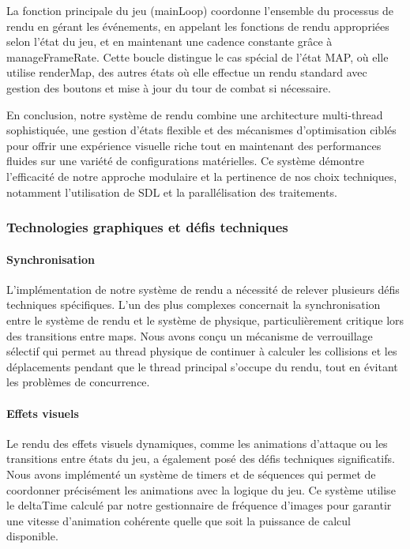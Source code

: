 \documentclass[12pt,a4paper, twoside]{article}
\begin{document}
La fonction principale du jeu (mainLoop) coordonne l'ensemble du processus de rendu en gérant les événements, en appelant les fonctions de rendu appropriées selon l'état du jeu, et en maintenant une cadence constante grâce à manageFrameRate. Cette boucle distingue le cas spécial de l'état MAP, où elle utilise renderMap, des autres états où elle effectue un rendu standard avec gestion des boutons et mise à jour du tour de combat si nécessaire.

En conclusion, notre système de rendu combine une architecture multi-thread sophistiquée, une gestion d'états flexible et des mécanismes d'optimisation ciblés pour offrir une expérience visuelle riche tout en maintenant des performances fluides sur une variété de configurations matérielles. Ce système démontre l'efficacité de notre approche modulaire et la pertinence de nos choix techniques, notamment l'utilisation de SDL et la parallélisation des traitements.

\subsubsection{Technologies graphiques et défis techniques}
\paragraph{Synchronisation} L'implémentation de notre système de rendu a nécessité de relever plusieurs défis techniques spécifiques. L'un des plus complexes concernait la synchronisation entre le système de rendu et le système de physique, particulièrement critique lors des transitions entre maps. Nous avons conçu un mécanisme de verrouillage sélectif qui permet au thread physique de continuer à calculer les collisions et les déplacements pendant que le thread principal s'occupe du rendu, tout en évitant les problèmes de concurrence.

\paragraph{Effets visuels} Le rendu des effets visuels dynamiques, comme les animations d'attaque ou les transitions entre états du jeu, a également posé des défis techniques significatifs. Nous avons implémenté un système de timers et de séquences qui permet de coordonner précisément les animations avec la logique du jeu. Ce système utilise le deltaTime calculé par notre gestionnaire de fréquence d'images pour garantir une vitesse d'animation cohérente quelle que soit la puissance de calcul disponible.
\end{document}
